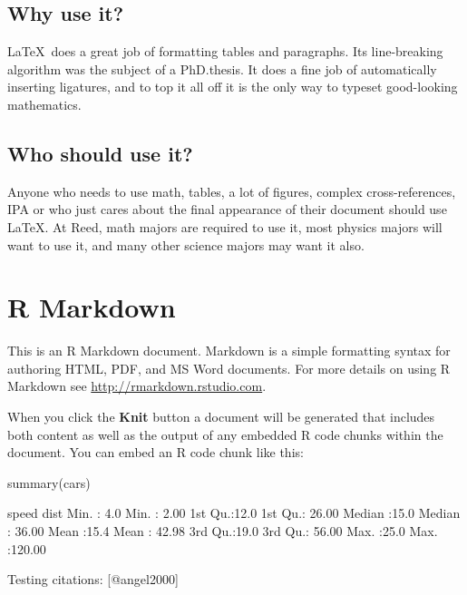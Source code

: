 \documentclass[12pt,twoside]{reedthesis}
\begin{document}
  \section{Why use it?}
  
  \LaTeX~does a great job of formatting tables and paragraphs. Its
  line-breaking algorithm was the subject of a PhD.\thinspace thesis. It
  does a fine job of automatically inserting ligatures, and to top it all
  off it is the only way to typeset good-looking mathematics.
  
  \section{Who should use it?}
  
  Anyone who needs to use math, tables, a lot of figures, complex
  cross-references, IPA or who just cares about the final appearance of
  their document should use \LaTeX. At Reed, math majors are required to
  use it, most physics majors will want to use it, and many other science
  majors may want it also.
  
  \chapter{R Markdown}
  
  This is an R Markdown document. Markdown is a simple formatting syntax
  for authoring HTML, PDF, and MS Word documents. For more details on
  using R Markdown see \url{http://rmarkdown.rstudio.com}.
  
  When you click the \textbf{Knit} button a document will be generated
  that includes both content as well as the output of any embedded R code
  chunks within the document. You can embed an R code chunk like this:
  
  \begin{CodeChunk}
  \begin{CodeInput}
  summary(cars)
  \end{CodeInput}
  \begin{CodeOutput}
       speed           dist       
   Min.   : 4.0   Min.   :  2.00  
   1st Qu.:12.0   1st Qu.: 26.00  
   Median :15.0   Median : 36.00  
   Mean   :15.4   Mean   : 42.98  
   3rd Qu.:19.0   3rd Qu.: 56.00  
   Max.   :25.0   Max.   :120.00  
  \end{CodeOutput}
  \end{CodeChunk}
  
  Testing citations: {[}@angel2000{]}
  
\end{document}
